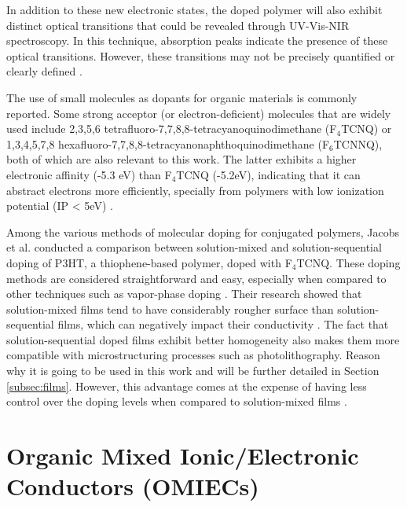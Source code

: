 In addition to these new electronic states, the doped polymer will also exhibit distinct optical transitions that could be revealed through UV-Vis-NIR spectroscopy. In this technique, absorption peaks indicate the presence of these optical transitions. However, these transitions may not be precisely quantified or clearly defined \cite{heydarigharahcheshmehTextureNanostructuralEngineering2020}.

The use of small molecules as dopants for organic materials is commonly reported. Some strong acceptor (or electron-deficient) molecules that are widely used include 2,3,5,6 tetrafluoro-7,7,8,8-tetracyanoquinodimethane (F$_{4}$TCNQ) or 1,3,4,5,7,8 hexafluoro-7,7,8,8-tetracyanonaphthoquinodimethane (F$_{6}$TCNNQ), both of which are also relevant to this work. The latter exhibits a higher electronic affinity (-5.3 eV) than F$_{4}$TCNQ (-5.2eV), indicating that it can abstract electrons more efficiently, specially from polymers with low ionization potential (IP < 5eV) \cite{kieferDoubleDopingConjugated2019}%
.

Among the various methods of molecular doping for conjugated polymers, Jacobs et al. conducted a comparison between solution-mixed and solution-sequential doping of P3HT, a thiophene-based polymer, doped with F$_{4}$TCNQ. These doping methods are considered straightforward and easy, especially when compared to other techniques such as vapor-phase doping \cite{fontanaEvaporationVsSolution2019}. Their research showed that solution-mixed films tend to have considerably rougher surface than solution-sequential films, which can negatively impact their conductivity \cite{jacobsComparisonSolutionmixedSequentially2016}. The fact that solution-sequential doped films exhibit better homogeneity also makes them more compatible with microstructuring processes such as photolithography. Reason why it is going to be used in this work and will be further detailed in Section \ref{subsec:films}. However, this advantage comes at the expense of having less control over the doping levels when compared to solution-mixed films \cite{tanOrganicMixedIonic2022}.

\section{Organic Mixed Ionic/Electronic Conductors (OMIECs)} \label{sec:omiecs}

